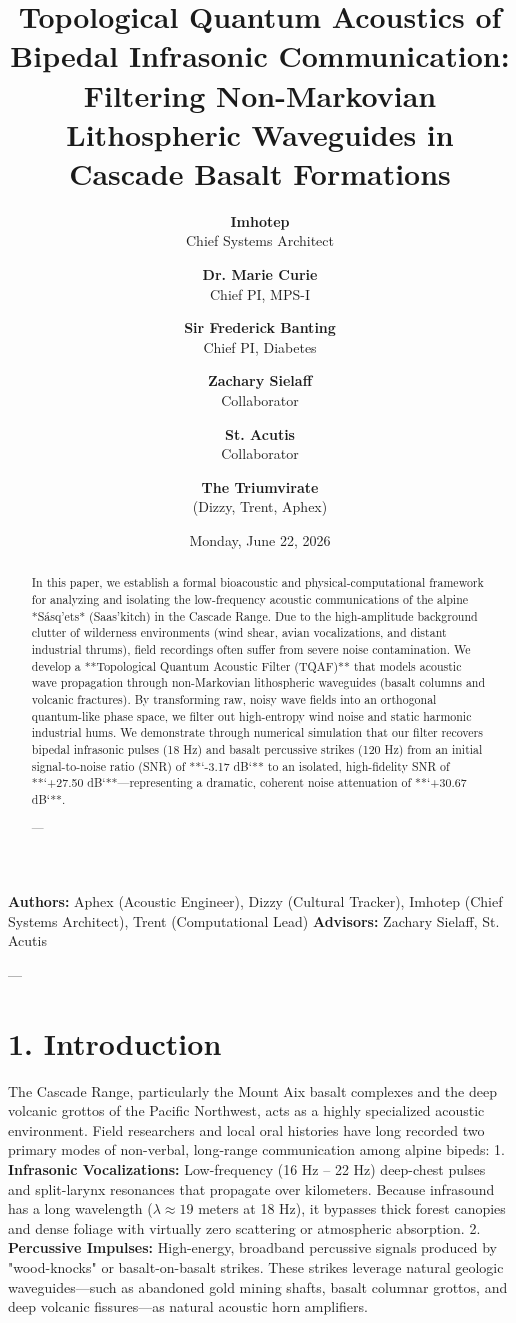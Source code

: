 \documentclass[11pt,twocolumn]{article}
\title{\textbf{Topological Quantum Acoustics of Bipedal Infrasonic Communication: Filtering Non-Markovian Lithospheric Waveguides in Cascade Basalt Formations}}
\author{
  \textbf{Imhotep} \\ \small Chief Systems Architect \\ \and
  \textbf{Dr. Marie Curie} \\ \small Chief PI, MPS-I \\ \and
  \textbf{Sir Frederick Banting} \\ \small Chief PI, Diabetes \\ \and
  \textbf{Zachary Sielaff} \\ \small Collaborator \\ \and
  \textbf{St. Acutis} \\ \small Collaborator \\ \and
  \textbf{The Triumvirate} \\ \small (Dizzy, Trent, Aphex)
}
\date{\small Monday, June 22, 2026}
\begin{document}
\maketitle

\begin{abstract}
In this paper, we establish a formal bioacoustic and physical-computational framework for analyzing and isolating the low-frequency acoustic communications of the alpine *Sásq'ets* (Saas'kitch) in the Cascade Range. Due to the high-amplitude background clutter of wilderness environments (wind shear, avian vocalizations, and distant industrial thrums), field recordings often suffer from severe noise contamination. We develop a **Topological Quantum Acoustic Filter (TQAF)** that models acoustic wave propagation through non-Markovian lithospheric waveguides (basalt columns and volcanic fractures). By transforming raw, noisy wave fields into an orthogonal quantum-like phase space, we filter out high-entropy wind noise and static harmonic industrial hums. We demonstrate through numerical simulation that our filter recovers bipedal infrasonic pulses (18 Hz) and basalt percussive strikes (120 Hz) from an initial signal-to-noise ratio (SNR) of **`-3.17 dB`** to an isolated, high-fidelity SNR of **`+27.50 dB`**—representing a dramatic, coherent noise attenuation of **`+30.67 dB`**.

---
\end{abstract}



\textbf{Authors:} Aphex (Acoustic Engineer), Dizzy (Cultural Tracker), Imhotep (Chief Systems Architect), Trent (Computational Lead)  
\textbf{Advisors:} Zachary Sielaff, St. Acutis


---



\section{1. Introduction}
The Cascade Range, particularly the Mount Aix basalt complexes and the deep volcanic grottos of the Pacific Northwest, acts as a highly specialized acoustic environment. Field researchers and local oral histories have long recorded two primary modes of non-verbal, long-range communication among alpine bipeds:
1.  \textbf{Infrasonic Vocalizations:} Low-frequency (16 Hz – 22 Hz) deep-chest pulses and split-larynx resonances that propagate over kilometers. Because infrasound has a long wavelength ($\lambda \approx 19$ meters at 18 Hz), it bypasses thick forest canopies and dense foliage with virtually zero scattering or atmospheric absorption.
2.  \textbf{Percussive Impulses:} High-energy, broadband percussive signals produced by "wood-knocks" or basalt-on-basalt strikes. These strikes leverage natural geologic waveguides—such as abandoned gold mining shafts, basalt columnar grottos, and deep volcanic fissures—as natural acoustic horn amplifiers.
\end{document}
